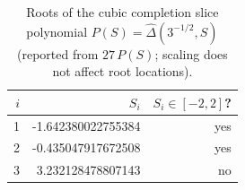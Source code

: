 \begin{table}[H]
\centering
\scriptsize
\setlength{\tabcolsep}{6pt}
\caption{Roots of the cubic completion slice polynomial $P(S)=\widehat\Delta(3^{-1/2},S)$ (reported from $27\,P(S)$; scaling does not affect root locations).}
\label{tab:sync_kernel_xi_cubic_roots}
\begin{tabular}{r r r}
\toprule
$i$ & $S_i$ & $S_i\in[-2,2]$?\\
\midrule
1 & -1.642380022755384 & yes\\
2 & -0.435047917672508 & yes\\
3 & 3.232128478807143 & no\\
\bottomrule
\end{tabular}
\end{table}
